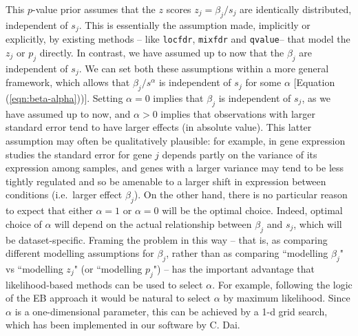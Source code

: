 \documentclass[11pt]{article}
\newtheorem{result}{Result}
\def\bhat{\hat{\beta}}
\def\qvalue{{\tt qvalue}\xspace}
\def\locfdr{{\tt locfdr}\xspace}
\def\mixfdr{{\tt mixfdr}\xspace}
\def\ashr{{\tt ashr}\xspace}
\begin{document}
This $p$-value prior assumes that the $z$ scores $z_j=\beta_j/s_j$
are identically distributed, independent of $s_j$. This is essentially the assumption made, implicitly or explicitly, by existing methods -- like \locfdr, \mixfdr and \qvalue --
that model the $z_j$ or $p_j$ directly.  In contrast, we have assumed up to now that the $\beta_j$ are independent of $s_j$. 
We can set both these assumptions within a more general framework, which allows that $\beta_j/s^\alpha$ is independent of $s_j$ for some $\alpha$ [Equation (\ref{eqn:beta-alpha}))]. Setting $\alpha=0$ implies that $\beta_j$ is
independent of $s_j$, as we have assumed up to now, and $\alpha>0$ implies that observations with larger standard error tend to have larger
effects (in absolute value). This latter assumption may often be qualitatively plausible: 
for example, in gene expression studies the standard error for gene $j$ depends partly on
the variance of its expression among samples, and genes with a larger variance may tend to be less tightly regulated and
so be amenable to a larger shift in expression between conditions (i.e.~larger effect $\beta_j$).
On the other hand, there is no particular reason to expect that either $\alpha=1$ or $\alpha=0$ will be the optimal choice.
Indeed, optimal choice of $\alpha$ will depend on the actual relationship between $\beta_j$ and $s_j$,
which will be dataset-specific. 
Framing the problem in this way -- that is, as comparing different modelling assumptions for $\beta_j$, rather than as 
comparing ``modelling $\beta_j$" vs  ``modelling $z_j$" (or ``modelling $p_j$") -- has the important advantage that 
likelihood-based methods can be used to select $\alpha$. For example, following the logic of the EB approach it
would be natural to select $\alpha$ by maximum likelihood. Since $\alpha$ is a one-dimensional parameter, this can be achieved by a 1-d grid search,
which has been implemented in our software by C. Dai. 




\end{document}
